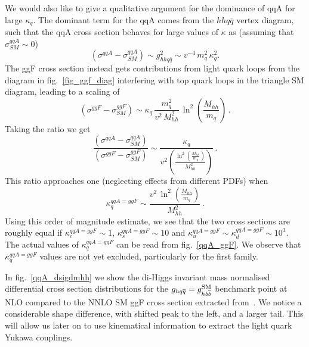 We would also like to give a qualitative argument for the dominance of qqA for large $\kappa_q$.
The dominant term for the qqA comes from the $hh q \bar q$ vertex diagram, such that the qqA cross section behaves for large values of $\kappa$ as (assuming that $ \sigma^{qqA}_{SM}\sim 0 $)
\begin{equation}
	(\sigma^{qqA}-\sigma^{qqA}_{SM}) \sim  g_{hh q \bar q}^2 \sim v^{-4}\,{m_q^2\,\kappa_q^2}.
\end{equation}
The ggF cross section instead gets contributions from light quark loops from  the diagram in fig.~\ref{fig_ggf_diag} interfering with top quark loops in the triangle SM diagram,  leading to a scaling of
\begin{equation}
	(\sigma^{ggF} - \sigma^{ggF}_{SM} ) \sim  \kappa_q\, \frac{m_q^2}{ v^2\,M_{hh}^2}\,\ln^2{\left(\frac{M_{hh}}{m_q}\right)}\,.
\end{equation}
Taking the ratio we get
\begin{equation}
	\frac{(\sigma^{qqA}-\sigma^{qqA}_{SM})}{(\sigma^{ggF} - \sigma^{ggF}_{SM} )} \sim  \frac{\kappa_q}{ v^2\left(\frac{
					\ln^2{\left(\frac{M_{hh}}{m_q}\right)}}{M_{hh}^2}\right)}\,.
\end{equation}
This ratio approaches one (neglecting effects from different PDFs) when
\begin{equation}
	\kappa_q^{qqA = ggF} \sim  \frac{v^2\,\ln^2{\left(\frac{M_{hh}}{m_q}\right)}}{M_{hh}^2}\,.
\end{equation}
Using this order of magnitude estimate, we see that  the two cross sections are roughly equal if $\kappa_c^{qqA = ggF} \sim 1$, $\kappa_s^{qqA = ggF} \sim 10$ and $\kappa_u^{qqA = ggF} \sim \kappa_d^{qqA = ggF} \sim 10^3$.
The actual values of $\kappa_q^{qqA = ggF}$ can be read from fig.~\ref{qqA_ggF}. We observe that $ \kappa_q^{qqA = ggF}$ values  are not yet excluded, particularly for the first family.
\par
In fig.~\ref{qqA_dsigdmhh} we show the di-Higgs invariant mass  normalised differential cross section distributions for the $g_{hq \overline q} = g_{h b \overline b}^{\mathrm{SM}}$ benchmark point at NLO compared to the NNLO SM ggF cross section extracted from~\cite{Grazzini:2018bsd}. We notice a considerable shape difference, with shifted peak to the left, and a larger tail. This will allow us later on to use kinematical information to extract the light quark Yukawa couplings.
